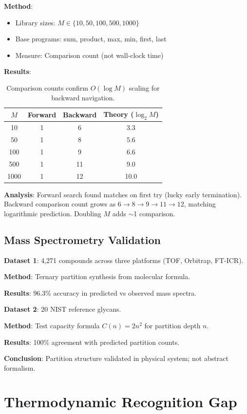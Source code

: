 \documentclass[twocolumn,aps,prl,superscriptaddress,floatfix]{revtex4-2}
\begin{document}
\textbf{Method}:
\begin{itemize}
\item Library sizes: $M \in \{10, 50, 100, 500, 1000\}$
\item Base programs: sum, product, max, min, first, last
\item Measure: Comparison count (not wall-clock time)
\end{itemize}

\textbf{Results}:
\begin{table}[h]
\centering
\begin{tabular}{cccc}
\toprule
$M$ & Forward & Backward & Theory ($\log_2 M$) \\
\midrule
10 & 1 & 6 & 3.3 \\
50 & 1 & 8 & 5.6 \\
100 & 1 & 9 & 6.6 \\
500 & 1 & 11 & 9.0 \\
1000 & 1 & 12 & 10.0 \\
\bottomrule
\end{tabular}
\caption{Comparison counts confirm $O(\log M)$ scaling for backward navigation.}
\label{tab:exp3}
\end{table}

\textbf{Analysis}: Forward search found matches on first try (lucky early termination). Backward comparison count grows as $6 \to 8 \to 9 \to 11 \to 12$, matching logarithmic prediction. Doubling $M$ adds $\sim$1 comparison.

\subsection{Mass Spectrometry Validation}

\textbf{Dataset 1}: 4,271 compounds across three platforms (TOF, Orbitrap, FT-ICR).

\textbf{Method}: Ternary partition synthesis from molecular formula.

\textbf{Results}: 96.3\% accuracy in predicted vs observed mass spectra.

\textbf{Dataset 2}: 20 NIST reference glycans.

\textbf{Method}: Test capacity formula $C(n) = 2n^2$ for partition depth $n$.

\textbf{Results}: 100\% agreement with predicted partition counts.

\textbf{Conclusion}: Partition structure validated in physical system; not abstract formalism.

\section{Thermodynamic Recognition Gap}
\end{document}
